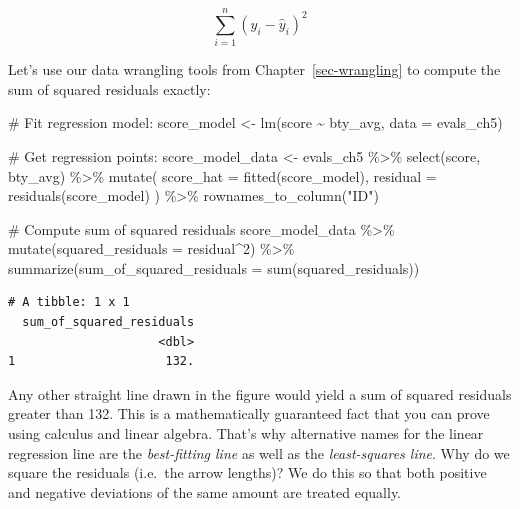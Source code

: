 \documentclass[
  letterpaper,
  DIV=11,
  numbers=noendperiod]{scrreprt}
\newenvironment{Shaded}{\begin{snugshade}}{\end{snugshade}}
\newcommand{\AttributeTok}[1]{\textcolor[rgb]{0.40,0.45,0.13}{#1}}
\newcommand{\CommentTok}[1]{\textcolor[rgb]{0.37,0.37,0.37}{#1}}
\newcommand{\DecValTok}[1]{\textcolor[rgb]{0.68,0.00,0.00}{#1}}
\newcommand{\FunctionTok}[1]{\textcolor[rgb]{0.28,0.35,0.67}{#1}}
\newcommand{\NormalTok}[1]{\textcolor[rgb]{0.00,0.23,0.31}{#1}}
\newcommand{\OtherTok}[1]{\textcolor[rgb]{0.00,0.23,0.31}{#1}}
\newcommand{\SpecialCharTok}[1]{\textcolor[rgb]{0.37,0.37,0.37}{#1}}
\newcommand{\StringTok}[1]{\textcolor[rgb]{0.13,0.47,0.30}{#1}}
\theoremstyle{definition}
\theoremstyle{remark}
\begin{document}
\[
\sum_{i=1}^{n}(y_i - \widehat{y}_i)^2
\]

Let's use our data wrangling tools from Chapter~\ref{sec-wrangling} to
compute the sum of squared residuals exactly:

\begin{Shaded}
\begin{Highlighting}[]
\CommentTok{\# Fit regression model:}
\NormalTok{score\_model }\OtherTok{\textless{}{-}} \FunctionTok{lm}\NormalTok{(score }\SpecialCharTok{\textasciitilde{}}\NormalTok{ bty\_avg, }\AttributeTok{data =}\NormalTok{ evals\_ch5)}

\CommentTok{\# Get regression points:}
\NormalTok{score\_model\_data }\OtherTok{\textless{}{-}}\NormalTok{ evals\_ch5 }\SpecialCharTok{\%\textgreater{}\%} 
  \FunctionTok{select}\NormalTok{(score, bty\_avg) }\SpecialCharTok{\%\textgreater{}\%} 
  \FunctionTok{mutate}\NormalTok{(}
    \AttributeTok{score\_hat =} \FunctionTok{fitted}\NormalTok{(score\_model),}
    \AttributeTok{residual =} \FunctionTok{residuals}\NormalTok{(score\_model)}
\NormalTok{    ) }\SpecialCharTok{\%\textgreater{}\%} 
  \FunctionTok{rownames\_to\_column}\NormalTok{(}\StringTok{"ID"}\NormalTok{)}

\CommentTok{\# Compute sum of squared residuals}
\NormalTok{score\_model\_data }\SpecialCharTok{\%\textgreater{}\%}
  \FunctionTok{mutate}\NormalTok{(}\AttributeTok{squared\_residuals =}\NormalTok{ residual}\SpecialCharTok{\^{}}\DecValTok{2}\NormalTok{) }\SpecialCharTok{\%\textgreater{}\%}
  \FunctionTok{summarize}\NormalTok{(}\AttributeTok{sum\_of\_squared\_residuals =} \FunctionTok{sum}\NormalTok{(squared\_residuals))}
\end{Highlighting}
\end{Shaded}

\begin{verbatim}
# A tibble: 1 x 1
  sum_of_squared_residuals
                     <dbl>
1                     132.
\end{verbatim}

Any other straight line drawn in the figure would yield a sum of squared
residuals greater than 132. This is a mathematically guaranteed fact
that you can prove using calculus and linear algebra. That's why
alternative names for the linear regression line are the
\emph{best-fitting line} as well as the \emph{least-squares line}. Why
do we square the residuals (i.e.~the arrow lengths)? We do this so that
both positive and negative deviations of the same amount are treated
equally.
\end{document}

